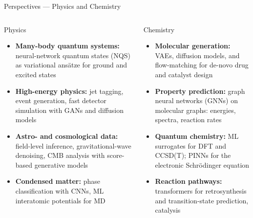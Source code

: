 \documentclass[aspectratio=169,11pt]{beamer}
\begin{document}
\begin{frame}{Perspectives --- Physics and Chemistry}
  \begin{columns}[T]
      \begin{block}{Physics}
        \begin{itemize}\itemsep2pt
          \item \textbf{Many-body quantum systems:}
                neural-network quantum states (NQS)
                as variational ans\"{a}tze for ground
                and excited states
          \item \textbf{High-energy physics:}
                jet tagging, event generation,
                fast detector simulation with
                GANs and diffusion models
          \item \textbf{Astro- and cosmological data:}
                field-level inference, gravitational-wave
                denoising, CMB analysis with
                score-based generative models
          \item \textbf{Condensed matter:}
                phase classification with CNNs,
                ML interatomic potentials for MD
        \end{itemize}
      \end{block}
      \begin{block}{Chemistry}
        \begin{itemize}\itemsep2pt
          \item \textbf{Molecular generation:}
                VAEs, diffusion models, and flow-matching
                for de-novo drug and catalyst design
          \item \textbf{Property prediction:}
                graph neural networks (GNNs) on
                molecular graphs: energies, spectra,
                reaction rates
          \item \textbf{Quantum chemistry:}
                ML surrogates for DFT and CCSD(T);
                PINNs for the electronic
                Schr\"{o}dinger equation
          \item \textbf{Reaction pathways:}
                transformers for retrosynthesis and
                transition-state prediction, catalysis
        \end{itemize}
      \end{block}
  \end{columns}
\end{frame}
\end{document}
